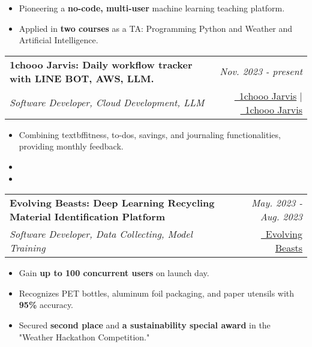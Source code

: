 \documentclass[a4paper,11pt]{article}
\makeatletter
\newcommand{\resumeSubheading}[4]{
\vspace{0.5mm}\item
    \begin{tabular*}{0.98\textwidth}[t]{l@{\extracolsep{\fill}}r}
        \textbf{#1} & \textit{\footnotesize{#4}} \\
        \textit{\footnotesize{#3}} &  \footnotesize{#2}\\
    \end{tabular*}
    \vspace{-2.4mm}
}
\newcommand{\resumeItemListStart}{\begin{justify}\begin{itemize}[leftmargin=3ex, rightmargin=2ex, noitemsep,labelsep=1.2mm,itemsep=0mm]\small}
\newcommand{\resumeItemListEnd}{\end{itemize}\end{justify}\vspace{-2mm}}
\makeatother
\begin{document}
            \vspace{-1.0mm}

            \resumeItemListStart
                \item {Pioneering a \textbf{no-code, multi-user} machine learning teaching platform.}
                \item {Applied in \textbf{two courses} as a TA: Programming Python and Weather and Artiﬁcial Intelligence.}
            \resumeItemListEnd

        \vspace{-2.0mm}

        \resumeSubheading
            { 1chooo Jarvis: Daily workflow tracker with LINE BOT, AWS, LLM.} 
            {
                \href{https://github.com/1chooo/1chooo-jarvis}{\faGithub\ 1chooo Jarvis} 
                | 
                \href{https://1chooo.github.io/1chooo-jarvis/}{\textcolor{black}{\faDesktop}\ 1chooo Jarvis} 
            } %
            {Software Developer, Cloud Development, LLM}%
            {Nov. 2023 - present} %
            
            \vspace{-1.0mm}
            
            \resumeItemListStart
                \item {Combining textbf{fitness, to-dos, savings, and journaling functionalities}, providing monthly feedback.}
                \item {}
                \item {}
            \resumeItemListEnd

        \vspace{-2.0mm}
    
        \resumeSubheading
            { Evolving Beasts: Deep Learning Recycling Material Identification Platform} 
            {
                \href{https://github.com/1chooo/evolving-beasts}{\faGithub\ Evolving Beasts} 
            } %
            {Software Developer, Data Collecting, Model Training}%
            {May. 2023 - Aug. 2023} %
    
            \vspace{-1.0mm}
    
            \resumeItemListStart
                \item {Gain \textbf{up to 100 concurrent users} on launch day.}
                \item {Recognizes PET bottles, aluminum foil packaging, and paper utensils with \textbf{95\%} accuracy.}
                \item {Secured \textbf{second place} and \textbf{a sustainability special award} in the "Weather Hackathon Competition."}
            \resumeItemListEnd
            
\end{document}
